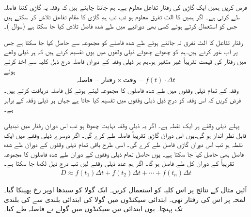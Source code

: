 فرض کریں ہمیں ایک گاڑی کی رفتار تفاعل  معلوم ہے۔ ہم جاننا چاہتے ہیں کہ وقفہ   یہ گاڑی کتنا فاصلہ طے کرتی ہے۔ اگر ہمیں  کا الٹ تفرق  معلوم ہو تب تب ہم گاڑی کا مقام تفاعل   تلاش کر سکتے ہیں جس کو استعمال کرتے ہوئے کسی بھی دورانیے میں طے شدہ فاصل  تلاش کیا جا سکتا ہے (سوال )۔

رفتار تفاعل  کا الٹ تفرق نہ جانتے ہوئے طے شدہ فاصلے کو مجموعہ سے حاصل کیا جا سکتا ہے جس پر اب غور کرتے ہیں۔ہم  کو چھوٹے چھوٹے ذیلی وقفوں میں یوں تقسیم کرتے ہیں کہ ہر ذیلی وقفے میں رفتار کی قیمت تقریباً غیر متغیر ہو۔ہم ہر ذیلی وقفہ کے دوران فاصلہ درج ذیل کلیہ سے اخذ کرتے ہوئے
\begin{align*}
\text{فاصلہ}=\text{رفتار}\times \text{وقت}=f(t)\cdot  \Delta t
\end{align*}
 وقفہ  کے تمام ذیلی وقفوں میں طے شدہ فاصلوں کا مجموعہ لیتے ہوئے کل فاصلہ دریافت کرتے ہیں۔ فرض کریں کہ اس وقفہ کو درج ذیل ذیلی وقفوں میں تقسیم کیا جاتا ہے جہاں ہر ذیلی وقفہ  کے برابر ہے۔
\begin{center}
\end{center}
پہلے ذیلی وقفے پر  ایک نقطہ ہے۔ اگر یہ ذیلی وقفہ نہایت چھوٹا ہو تب اس دوران رفتار میں تبدیلی قابل نظر انداز ہو گی۔یوں اس دوران گاڑی تقریباً  فاصلہ طے کرے گی۔ اگر  دوسرے ذیلی وقفے میں ایک نقطہ ہو تب اس دوران گاڑی  فاصل طے کرے گی۔ اسی طرح باقی تمام ذیلی وقفوں کے دوران طے شدہ فاصل بھی حاصل کیا جا سکتا ہے۔ یوں حاصل تمام ذیلی وقفوں کے دوران طے شدہ فاصلوں کا مجموعہ تقریباً   کے دوران کل طے فاصل  ہو گا۔ اگر ہم  عدد ذیلی وقفے لیں تب درج ذیل لکھا جا سکتا ہے۔
\begin{align}\label{مساوات_تکمل_طے_شدہ_فاصلہ_عمومی}
D\approx f(t_1)\Delta t+f(t_2)\Delta t+\cdots+f(t_n)\Delta t
\end{align}

آئیں مثال  کے نتائج پر اس کلیہ کو استعمال کریں۔ ایک گولا کو سیدھا اوپر رخ پھینکا گیا۔ لمحہ  پر اس کی رفتار  تھی۔ ابتدائی   سیکنڈوں میں گولا  کی ابتدائی بلندی سے  کی بلندی تک پہنچا۔ یوں ابتدائی تین سیکنڈوں میں گولے نے  فاصلہ طے کیا۔ 

